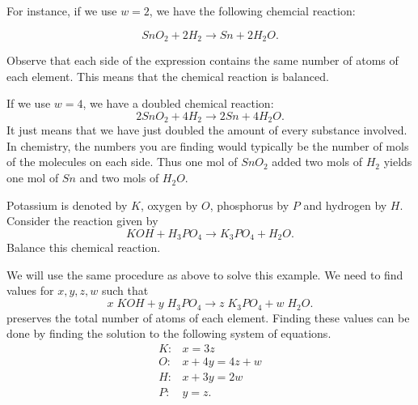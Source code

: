 \documentclass{ximera}
\begin{document}
\begin{exploration}
\begin{example}
For instance, if we use $w=2$, we have the following chemcial reaction: 

\begin{equation*}
  SnO_2+2H_2\rightarrow Sn+2H_2O.
\end{equation*}

Observe that each side of the expression contains the same number of
atoms of each element. This means that the chemical reaction is
balanced. 

If we use $w=4$, we have a doubled chemical reaction:
\begin{equation*}
  2SnO_2+4H_2\rightarrow 2Sn+4H_2O.
\end{equation*}
It just means that we have just doubled the amount of
every substance involved. In chemistry, the numbers you are finding
would typically be the number of mols of the molecules on each
side. Thus one mol of $SnO_2$ added two mols of $H_2$ yields one mol
of $Sn$ and two mols of $H_2O$.

\end{example}


\begin{example}
  Potassium is denoted by $K$, oxygen by $O$, phosphorus by $P$ and
  hydrogen by $H$.  Consider the reaction given by
  \begin{equation*}
    KOH+H_3PO_4\rightarrow K_3PO_4+H_2O.
  \end{equation*}
  Balance this chemical reaction.


\begin{solution}
  We will use the same procedure as above to solve this example. We
  need to find values for $x,y,z,w$ such that
  \begin{equation*}
    x\;KOH+y\;H_3PO_4\rightarrow z\;K_3PO_4+w\;H_2O.
  \end{equation*}
  preserves the total number of atoms of each element.  Finding these
  values can be done by finding the solution to the following system
  of equations.
  \begin{equation*}
    \begin{array}{cl}
      K: & x=3z \\
      O: & x+4y=4z+w \\
      H: & x+3y=2w \\
      P: & y=z.
    \end{array}
  \end{equation*}
 

\end{solution}
\end{example}
\end{exploration}
\end{document}
